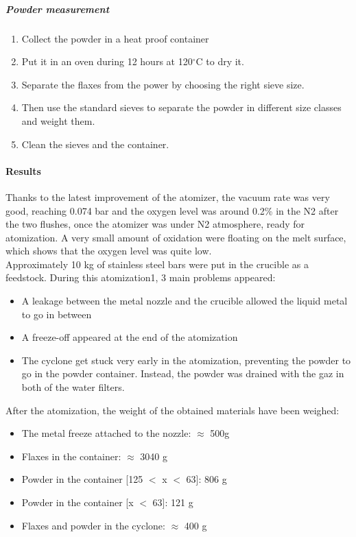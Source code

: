 \documentclass[../../main.tex]{subfiles}
\begin{document}
\subparagraph{Powder measurement}
\label{}

\begin{enumerate}
    \item Collect the powder in a heat proof container
    \item Put it in an oven during 12 hours at 120$^\circ$C to dry it.
    \item Separate the flaxes from the power by choosing the right sieve size.
    \item Then use the standard sieves to separate the powder in different size classes and weight them.
    \item Clean the sieves and the container.
\end{enumerate}

\paragraph{Results}

Thanks to the latest improvement of the atomizer, the vacuum rate was very good, reaching 0.074 bar and the oxygen level was around 0.2\% in the N2 after the two flushes, once the atomizer was under N2 atmosphere, ready for atomization. A very small amount of oxidation were floating on the melt surface, which shows that the oxygen level was quite low.\\

Approximately 10 kg of stainless steel bars were put in the crucible as a feedstock. During this atomization1, 3 main problems appeared:
\begin{itemize}
    \item A leakage between the metal nozzle and the crucible allowed the liquid metal to go in between
    \item A freeze-off appeared at the end of the atomization
    \item The cyclone get stuck very early in the atomization, preventing the powder to go in the powder container. Instead, the powder was drained with the gaz in both of the water filters.
\end{itemize}

After the atomization, the weight of the obtained materials have been weighed:
\begin{itemize}
    \item The metal freeze attached to the nozzle: $\approx$ 500g
    \item Flaxes in the container: $\approx$ 3040 g
    \item Powder in the container [125 $<$ x $<$ 63]: 806 g
    \item Powder in the container [x $<$ 63]: 121 g
    \item Flaxes and powder in the cyclone: $\approx$ 400 g
\end{itemize}
\end{document}
